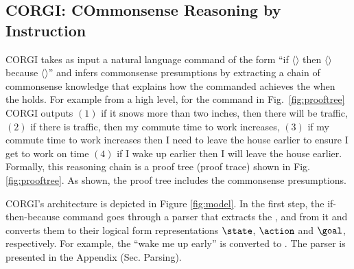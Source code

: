 \subsection{CORGI: COmmonsense Reasoning by Instruction}
\label{sec:corgi}
CORGI takes as input a natural language command of the form ``if $\langle$\textState$\rangle$ then $\langle$\textAction$\rangle$ because $\langle$\textGoal$\rangle$'' and infers commonsense presumptions by extracting a chain of commonsense knowledge that explains how the commanded \textAction achieves the \textGoal when the \textState holds. For example from a high level, for the command in Fig.~\ref{fig:prooftree} CORGI outputs $(1)$ if it snows more than two inches, then there will be traffic, $(2)$ if there is traffic, then my commute time to work increases, $(3)$ if my commute time to work increases then I need to leave the house earlier to ensure I get to work on time $(4)$ if I wake up earlier then I will leave the house earlier. Formally, this reasoning chain is a proof tree (proof trace) shown in Fig.\ref{fig:prooftree}. 
As shown, the proof tree includes the commonsense presumptions.%

CORGI's architecture is depicted in Figure \ref{fig:model}. In the first step, the if-then-because command goes through a parser that extracts the \textState, \textAction and \textGoal from it and converts them to their logical form representations $\state$, $\action$ and $\goal$, respectively.
For example, the \textAction ``wake me up early'' is converted to . The parser is presented in the Appendix (Sec. Parsing). %

